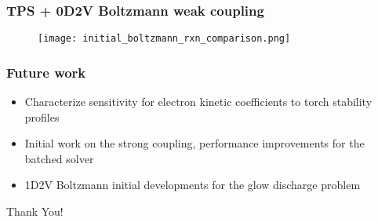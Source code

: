 \documentclass[mathserif, aspectratio=169]{beamer}
\begin{document}
\begin{frame}
	\frametitle{TPS + 0D2V Boltzmann weak coupling}
	\begin{figure}
		\centering
		\texttt{[image: initial\_boltzmann\_rxn\_comparison.png]}
	\end{figure}
\end{frame}
%	

\begin{frame}
	\frametitle{Future work}
	\begin{itemize}
		\item Characterize sensitivity for electron kinetic coefficients to torch stability profiles
		\item Initial work on the strong coupling, performance improvements for the batched solver
		\item 1D2V Boltzmann initial developments for the glow discharge problem
	\end{itemize}
	\begin{center}
		Thank You!
	\end{center}
\end{frame}
\end{document}
